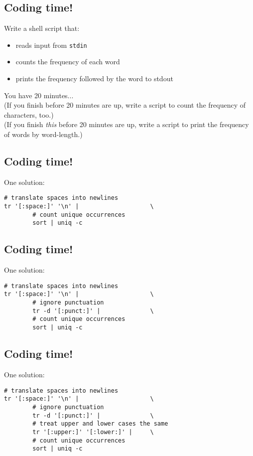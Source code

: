 \documentclass[xga]{xdvislides}
\begin{document}
\subsection{Coding time!}
Write a shell script that:
\begin{itemize}
	\item reads input from {\tt stdin}
	\item counts the frequency of each word
	\item prints the frequency followed by the word to stdout
\end{itemize}
\vspace{.5in}
You have 20 minutes... \\

\vspace{.5in}
(If you finish before 20 minutes are up, write a script to count the
frequency of characters, too.) \\

\vspace{.5in}
(If you finish {\em this} before 20 minutes are up, write a script
to print the frequency of words by word-length.)

\subsection{Coding time!}
One solution:
\begin{verbatim}
# translate spaces into newlines
tr '[:space:]' '\n' |                    \
        # count unique occurrences
        sort | uniq -c
\end{verbatim}

\subsection{Coding time!}
One solution:
\begin{verbatim}
# translate spaces into newlines
tr '[:space:]' '\n' |                    \
        # ignore punctuation
        tr -d '[:punct:]' |              \
        # count unique occurrences
        sort | uniq -c
\end{verbatim}

\subsection{Coding time!}
One solution:
\begin{verbatim}
# translate spaces into newlines
tr '[:space:]' '\n' |                    \
        # ignore punctuation
        tr -d '[:punct:]' |              \
        # treat upper and lower cases the same
        tr '[:upper:]' '[:lower:]' |     \
        # count unique occurrences
        sort | uniq -c
\end{verbatim}
\end{document}
